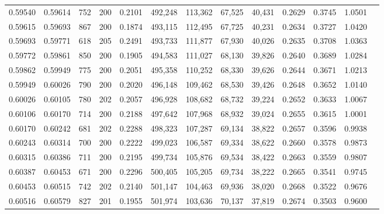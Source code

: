 \begin{tabular}{rrrrrrrrrrrrr}
0.59540 & 0.59614 &   752 & 200 &                                     0.2101 & 492,248 & 113,362 &  67,525 &  40,431 & 0.2629 & 0.3745 & 1.0501 \\
0.59615 & 0.59693 &   867 & 200 &                                     0.1874 & 493,115 & 112,495 &  67,725 &  40,231 & 0.2634 & 0.3727 & 1.0420 \\
0.59693 & 0.59771 &   618 & 205 &                                     0.2491 & 493,733 & 111,877 &  67,930 &  40,026 & 0.2635 & 0.3708 & 1.0363 \\
0.59772 & 0.59861 &   850 & 200 &                                     0.1905 & 494,583 & 111,027 &  68,130 &  39,826 & 0.2640 & 0.3689 & 1.0284 \\
0.59862 & 0.59949 &   775 & 200 &                                     0.2051 & 495,358 & 110,252 &  68,330 &  39,626 & 0.2644 & 0.3671 & 1.0213 \\
0.59949 & 0.60026 &   790 & 200 &                                     0.2020 & 496,148 & 109,462 &  68,530 &  39,426 & 0.2648 & 0.3652 & 1.0140 \\
0.60026 & 0.60105 &   780 & 202 &                                     0.2057 & 496,928 & 108,682 &  68,732 &  39,224 & 0.2652 & 0.3633 & 1.0067 \\
0.60106 & 0.60170 &   714 & 200 &                                     0.2188 & 497,642 & 107,968 &  68,932 &  39,024 & 0.2655 & 0.3615 & 1.0001 \\
0.60170 & 0.60242 &   681 & 202 &                                     0.2288 & 498,323 & 107,287 &  69,134 &  38,822 & 0.2657 & 0.3596 & 0.9938 \\
0.60243 & 0.60314 &   700 & 200 &                                     0.2222 & 499,023 & 106,587 &  69,334 &  38,622 & 0.2660 & 0.3578 & 0.9873 \\
0.60315 & 0.60386 &   711 & 200 &                                     0.2195 & 499,734 & 105,876 &  69,534 &  38,422 & 0.2663 & 0.3559 & 0.9807 \\
0.60387 & 0.60453 &   671 & 200 &                                     0.2296 & 500,405 & 105,205 &  69,734 &  38,222 & 0.2665 & 0.3541 & 0.9745 \\
0.60453 & 0.60515 &   742 & 202 &                                     0.2140 & 501,147 & 104,463 &  69,936 &  38,020 & 0.2668 & 0.3522 & 0.9676 \\
0.60516 & 0.60579 &   827 & 201 &                                     0.1955 & 501,974 & 103,636 &  70,137 &  37,819 & 0.2674 & 0.3503 & 0.9600 \\

\end{tabular}
